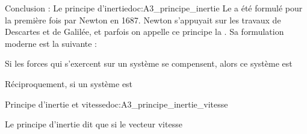 \begin{doc}{Conclusion : Le principe d'inertie}{doc:A3_principe_inertie}
  \chevron Le  a été formulé pour la première fois par Newton en 1687.
  Newton s'appuyait sur les travaux de Descartes et de Galilée, et parfois on appelle ce principe la .
  Sa formulation moderne est la suivante :
  
  \begin{importants}
    Si les forces qui s'exercent sur un système se compensent, alors ce système est 
  \end{importants}
  
  \begin{importants}
    Réciproquement, si un système est
  \end{importants}
\end{doc}



\begin{doc}{Principe d'inertie et vitesse}{doc:A3_principe_inertie_vitesse}
  \begin{importants}
    Le principe d'inertie dit que si le vecteur vitesse
  \end{importants}
\end{doc}